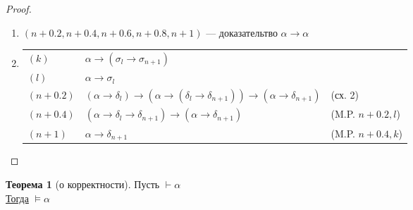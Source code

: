 \documentclass[oneside]{book}
\theoremstyle{plain}
\theoremstyle{remark}
\theoremstyle{definition}
\newtheorem{theorem}{Теорема}[section]
\begin{document}
\begin{proof}
\begin{description}
\begin{enumerate}
\begin{center}
\begin{tabular}{l|ll}
\end{tabular}
\end{center}
\item \((n + 0.2, n + 0.4, n+0.6, n+0.8, n+1)\) --- доказательтво \(\alpha \to \alpha\)
\item \-
\begin{center}
\begin{tabular}{lll}
\((k)\) & \(\alpha \to (\sigma_l \to \sigma_{n + 1})\) & \\
\((l)\) & \(\alpha \to \sigma_l\) & \\
\((n + 0.2)\) & \((\alpha \to \delta_l) \to (\alpha \to (\delta_l \to \delta_{n + 1})) \to (\alpha \to \delta_{n + 1})\) & (сх. 2)\\
\((n + 0.4)\) & \((\alpha \to \delta_l \to \delta_{n + 1}) \to (\alpha \to \delta_{n + 1})\) & (M.P. \(n + 0.2, l\))\\
\((n + 1)\) & \(\alpha \to \delta_{n + 1}\) & (M.P. \(n + 0.4, k\))\\
\end{tabular}
\end{center}
\end{enumerate}
\end{description}
\end{proof}
\begin{theorem}[о корректности]
Пусть \(\vdash \alpha\) \\
\uline{Тогда} \(\vDash \alpha\)
\label{org2c0b9fb}
\end{theorem}
\end{document}
